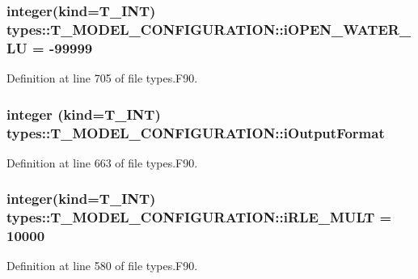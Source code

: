 \hypertarget{typetypes_1_1_t___m_o_d_e_l___c_o_n_f_i_g_u_r_a_t_i_o_n_a41211037efdb530bae08c874407efb84}{
\subsubsection[{iOPEN\_\-WATER\_\-LU}]{\setlength{\rightskip}{0pt plus 5cm}integer(kind={\bf T\_\-INT}) {\bf types::T\_\-MODEL\_\-CONFIGURATION::iOPEN\_\-WATER\_\-LU} = -\/99999}}
\label{typetypes_1_1_t___m_o_d_e_l___c_o_n_f_i_g_u_r_a_t_i_o_n_a41211037efdb530bae08c874407efb84}


Definition at line 705 of file types.F90.

\hypertarget{typetypes_1_1_t___m_o_d_e_l___c_o_n_f_i_g_u_r_a_t_i_o_n_a4be49786d89fd8779eef94a907b5a1c8}{
\subsubsection[{iOutputFormat}]{\setlength{\rightskip}{0pt plus 5cm}integer (kind={\bf T\_\-INT}) {\bf types::T\_\-MODEL\_\-CONFIGURATION::iOutputFormat}}}
\label{typetypes_1_1_t___m_o_d_e_l___c_o_n_f_i_g_u_r_a_t_i_o_n_a4be49786d89fd8779eef94a907b5a1c8}


Definition at line 663 of file types.F90.

\hypertarget{typetypes_1_1_t___m_o_d_e_l___c_o_n_f_i_g_u_r_a_t_i_o_n_a1d1fab7835ef881f626d8ac98b1f0288}{
\subsubsection[{iRLE\_\-MULT}]{\setlength{\rightskip}{0pt plus 5cm}integer(kind={\bf T\_\-INT}) {\bf types::T\_\-MODEL\_\-CONFIGURATION::iRLE\_\-MULT} = 10000}}
\label{typetypes_1_1_t___m_o_d_e_l___c_o_n_f_i_g_u_r_a_t_i_o_n_a1d1fab7835ef881f626d8ac98b1f0288}


Definition at line 580 of file types.F90.

